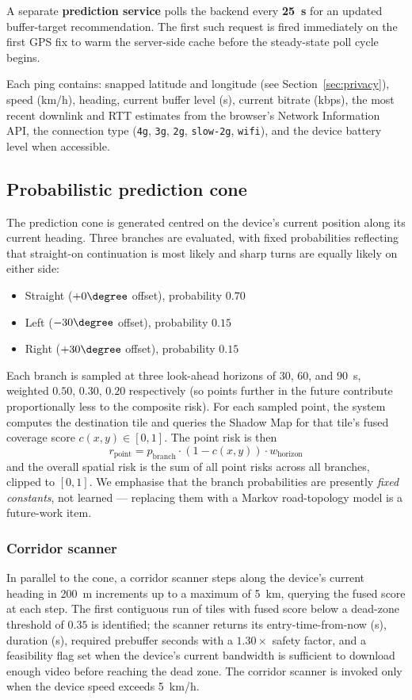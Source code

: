 \documentclass[conference]{IEEEtran}
\begin{document}
A separate \textbf{prediction service} polls the backend every
\textbf{25~s} for an updated buffer-target recommendation. The first such
request is fired immediately on the first GPS fix to warm the
server-side cache before the steady-state poll cycle begins.

Each ping contains: snapped latitude and longitude (see
Section~\ref{sec:privacy}), speed (km/h), heading, current buffer level
(s), current bitrate (kbps), the most recent downlink and RTT estimates
from the browser's Network Information API, the connection type
(\texttt{4g}, \texttt{3g}, \texttt{2g}, \texttt{slow-2g}, \texttt{wifi}),
and the device battery level when accessible.

\subsection{Probabilistic prediction cone}
\label{sec:cone}
The prediction cone is generated centred on the device's current position
along its current heading. Three branches are evaluated, with fixed
probabilities reflecting that straight-on continuation is most likely and
sharp turns are equally likely on either side:
\begin{itemize}
  \item Straight ($+0\degree$ offset), probability $0.70$
  \item Left ($-30\degree$ offset), probability $0.15$
  \item Right ($+30\degree$ offset), probability $0.15$
\end{itemize}
Each branch is sampled at three look-ahead horizons of $30$, $60$, and
$90$~s, weighted $0.50$, $0.30$, $0.20$ respectively (so points further
in the future contribute proportionally less to the composite risk).
For each sampled point, the system computes the destination tile and
queries the Shadow Map for that tile's fused coverage score
$c(x,y) \in [0, 1]$. The point risk is then
\[
  r_{\text{point}} = p_{\text{branch}} \cdot (1 - c(x, y)) \cdot w_{\text{horizon}}
\]
and the overall spatial risk is the sum of all point risks across all
branches, clipped to $[0, 1]$. We emphasise that the branch probabilities
are presently \emph{fixed constants}, not learned --- replacing them with a
Markov road-topology model is a future-work item.

\subsubsection{Corridor scanner}
In parallel to the cone, a corridor scanner steps along the device's
current heading in 200~m increments up to a maximum of 5~km, querying the
fused score at each step. The first contiguous run of tiles with fused
score below a dead-zone threshold of $0.35$ is identified; the scanner
returns its entry-time-from-now (s), duration (s), required prebuffer
seconds with a $1.30\times$ safety factor, and a feasibility flag set
when the device's current bandwidth is sufficient to download enough
video before reaching the dead zone. The corridor scanner is invoked
only when the device speed exceeds 5~km/h.
\end{document}
